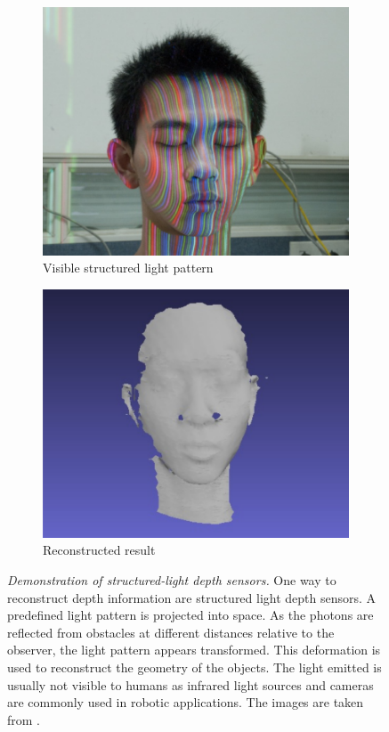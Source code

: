 \begin{figure}[H]
    \centering
    \begin{subfigure}[t]{0.45\textwidth}
        \includegraphics[width=\textwidth]{chapter03/img/depth_pattern_face.png}
        \caption{Visible structured light pattern}
    \end{subfigure}
    \begin{subfigure}[t]{0.45\textwidth}
        \includegraphics[width=\textwidth]{chapter03/img/depth_face_reconstructed.png}
        \caption{Reconstructed result}
    \end{subfigure}
    \caption[Demonstration of structured-light depth sensors]{\emph{Demonstration of structured-light depth sensors.} One way to reconstruct depth information are structured light depth sensors. A predefined light pattern is projected into space. As the photons are reflected from obstacles at different distances relative to the observer, the light pattern appears transformed. This deformation is used to reconstruct the geometry of the objects. The light emitted is usually not visible to humans as infrared light sources and cameras are commonly used in robotic applications. The images are taken from \cite{sl_depthsensor_calibration}.}\label{fig:sl_face}
\end{figure}

